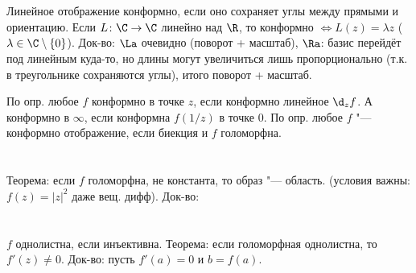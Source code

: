 \section{} %
	Линейное отображение конформно, если оно сохраняет углы между прямыми и ориентацию.
	Если $L \colon \C \to \C$ линейно над $\R$, то конформно $\iff L(z)=\lambda z$ ($\lambda \in \C \setminus \{0\}$).
	Док-во: $\La$ очевидно (поворот + масштаб), $\Ra$: базис перейдёт под линейным куда-то,
	но длины могут увеличиться лишь пропорционально (т.к. в треугольнике сохраняются углы),
	итого поворот + масштаб.

	По опр. любое $f$ конформно в точке $z$, если конформно линейное $\d_z f$.
	А конформно в $\infty$, если конформна $f(1/z)$ в точке 0.
	По опр. любое $f$ "--- конформно отображение, если биекция и $f$ голоморфна.
	\TODO

\section{} %
	Теорема: если $f$ голоморфна, не константа, то образ "--- область.
	(условия важны: $f(z)=|z|^2$ даже вещ. дифф).
	Док-во: \TODO

\section{} %
	$f$ однолистна, если инъективна.
	Теорема: если голоморфная однолистна, то $f'(z)\neq 0$.
	Док-во: пусть $f'(a)=0$ и $b=f(a)$.
	\TODO


\section{} %
	\TODO
